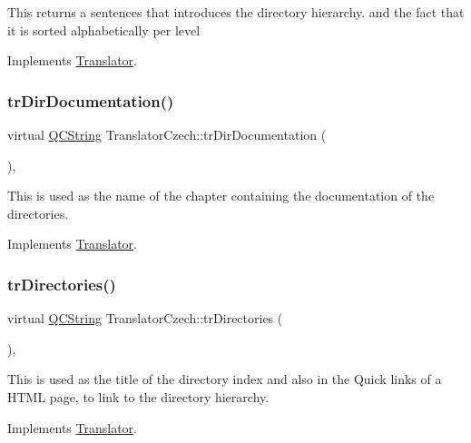 This returns a sentences that introduces the directory hierarchy. and the fact that it is sorted alphabetically per level 

Implements \mbox{\hyperlink{class_translator}{Translator}}.

\mbox{\label{class_translator_czech_a4469309f5c391636ecfe608d1680774d}} 
\subsubsection{\texorpdfstring{trDirDocumentation()}{trDirDocumentation()}}
{\footnotesize\ttfamily virtual \mbox{\hyperlink{class_q_c_string}{Q\+C\+String}} Translator\+Czech\+::tr\+Dir\+Documentation (\begin{DoxyParamCaption}{ }\end{DoxyParamCaption})\hspace{0.3cm}{\ttfamily [inline]}, {\ttfamily [virtual]}}

This is used as the name of the chapter containing the documentation of the directories. 

Implements \mbox{\hyperlink{class_translator}{Translator}}.

\mbox{\label{class_translator_czech_a5a70049ad39f783d34fdff2e6a289d40}} 
\subsubsection{\texorpdfstring{trDirectories()}{trDirectories()}}
{\footnotesize\ttfamily virtual \mbox{\hyperlink{class_q_c_string}{Q\+C\+String}} Translator\+Czech\+::tr\+Directories (\begin{DoxyParamCaption}{ }\end{DoxyParamCaption})\hspace{0.3cm}{\ttfamily [inline]}, {\ttfamily [virtual]}}

This is used as the title of the directory index and also in the Quick links of a H\+T\+ML page, to link to the directory hierarchy. 

Implements \mbox{\hyperlink{class_translator}{Translator}}.

